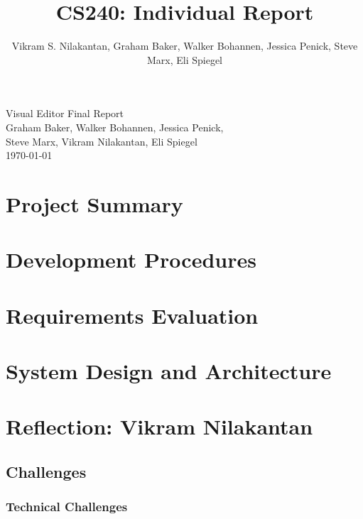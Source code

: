 \documentclass[a4paper]{article}
\title{CS240: Individual Report}
\author{Vikram S. Nilakantan, Graham Baker, Walker Bohannen, Jessica Penick, Steve Marx, Eli Spiegel}
\begin{document}

\begin{titlepage}
        \vspace*{\fill} %
        \begin{center}
                {\Huge Visual Editor Final Report}\\ [0.5cm]        
                
                {\Large Graham Baker, Walker Bohannen, Jessica Penick, \\Steve Marx, Vikram Nilakantan, Eli Spiegel}\\[0.4cm]
                \today %
        \end{center}
        \vspace*{\fill}
\end{titlepage}

\section{Project Summary}

\section{Development Procedures}

\section{Requirements Evaluation}

\section{System Design and Architecture}

\section{Reflection: Vikram Nilakantan}
\subsection{Challenges}
\subsubsection{Technical Challenges}
\end{document}
